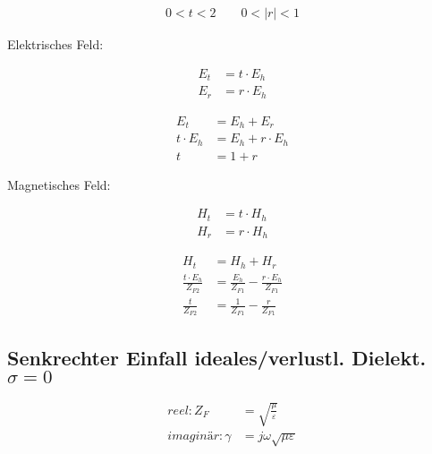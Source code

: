 \begin{align*}
    0<t<2 \qquad 0<|r|<1
\end{align*}

Elektrisches Feld:


\begin{align*}
    E_t & = t \cdot E_h \\
    E_r & = r \cdot E_h
\end{align*}

\begin{align*}
    E_t          & = E_h + E_r             \\
    t\cdot E_{h} & = E_{h} + r\cdot  E_{h} \\
    t          & = 1+ r
\end{align*}

Magnetisches Feld:


\begin{align*}
    H_t & = t \cdot H_h \\
    H_r & = r \cdot H_h
\end{align*}

\begin{align*}
    H_t                         & = H_h + H_r                                          \\
    \frac{t\cdot E_{h}}{Z_{F2}} & = \frac{E_{h}}{Z_{F1}} - \frac{r\cdot E_{h}}{Z_{F1}} \\
    \frac{t}{Z_{F2}}            & = \frac{1}{Z_{F1}} - \frac{r}{Z_{F1}}
\end{align*}




\subsection{Senkrechter Einfall ideales/verlustl. Dielekt. $\sigma = 0$}


\begin{align*}
    reel: Z_F & = \sqrt{\frac{\mu}{\varepsilon}}\\
    imaginär: \gamma & = j \omega \sqrt{ \mu \varepsilon}
\end{align*}

